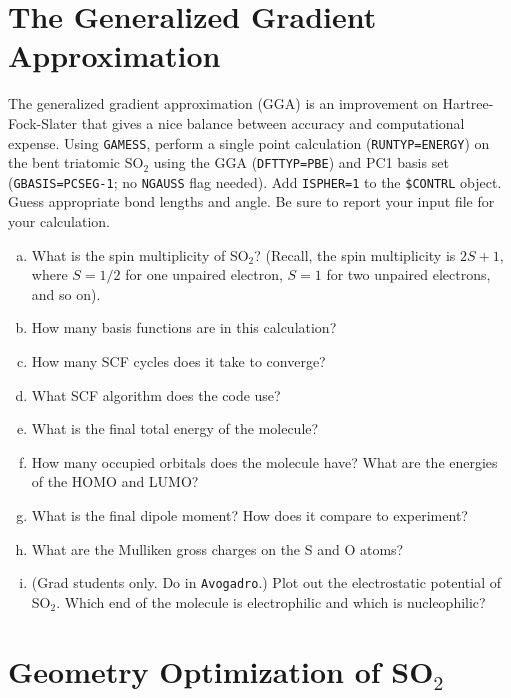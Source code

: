 \documentclass[11pt]{article}
\begin{document}
\section{The Generalized Gradient Approximation}
\label{sec:org3c5bef2}
The generalized gradient approximation (GGA) is an improvement on Hartree-Fock-Slater that gives a nice balance between accuracy and computational expense. Using \texttt{GAMESS}, perform a single point calculation (\texttt{RUNTYP=ENERGY}) on the bent triatomic SO\(_{\text{2}}\) using the GGA (\texttt{DFTTYP=PBE}) and PC1 basis set (\texttt{GBASIS=PCSEG-1}; no \texttt{NGAUSS} flag needed). Add \texttt{ISPHER=1} to the \texttt{\$CONTRL} object. Guess appropriate bond lengths and angle. Be sure to report your input file for your calculation.

\begin{enumerate}[(a)]
\item What is the spin multiplicity of SO\(_{\text{2}}\)? (Recall, the spin multiplicity is \(2S +1\), where \(S = 1/2\) for one unpaired electron, \(S = 1\) for two unpaired electrons, and so on).

\item How many basis functions are in this calculation?

\item How many SCF cycles does it take to converge?

\item What SCF algorithm does the code use?

\item What is the final total energy of the molecule?

\item How many occupied orbitals does the molecule have? What are the energies of the HOMO and LUMO?

\item What is the final dipole moment?  How does it compare to experiment?

\item What are the Mulliken gross charges on the S and O atoms?

\item (Grad students only.  Do in \texttt{Avogadro}.)  Plot out the electrostatic potential of SO\(_{\text{2}}\). Which end of the molecule is electrophilic and which is nucleophilic?
\end{enumerate}

\section{Geometry Optimization of SO\(_{\text{2}}\)}
\label{sec:org132fc89}
\end{document}
